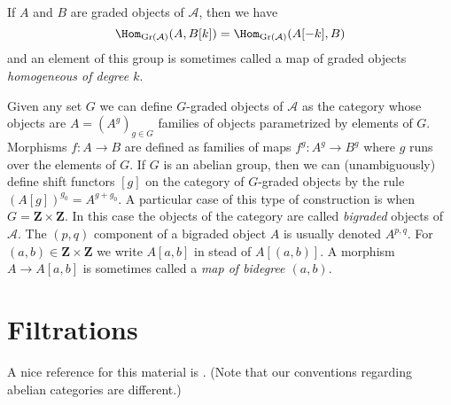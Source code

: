 \noindent
If $A$ and $B$ are graded objects of $\mathcal{A}$, then we have
\begin{equation}
\label{equation-hom-into-shift}
\Hom_{\text{Gr}(\mathcal{A})}(A, B[k]) =
\Hom_{\text{Gr}(\mathcal{A})}(A[-k], B)
\end{equation}
and an element of this group is sometimes called a map of graded
objects {\it homogeneous of degree $k$}.

\medskip\noindent
Given any set $G$ we can define $G$-graded objects of $\mathcal{A}$
as the category whose objects are $A = (A^g)_{g \in G}$
families of objects parametrized by elements of $G$. Morphisms
$f : A \to B$ are defined as families of maps $f^g : A^g \to B^g$
where $g$ runs over the elements of $G$. If $G$ is an abelian group,
then we can (unambiguously) define shift functors $[g]$ on the category
of $G$-graded objects by the rule $(A[g])^{g_0} = A^{g + g_0}$.
A particular case of this type of construction is when
$G = \mathbf{Z} \times \mathbf{Z}$. In this case the objects of
the category are called {\it bigraded} objects of $\mathcal{A}$.
The $(p, q)$ component of a bigraded object $A$ is usually denoted
$A^{p, q}$. For $(a, b) \in \mathbf{Z} \times \mathbf{Z}$ we write
$A[a, b]$ in stead of $A[(a, b)]$.
A morphism $A \to A[a, b]$ is sometimes called a
{\it map of bidegree $(a, b)$}.





\section{Filtrations}
\label{section-filtrations}

\noindent
A nice reference for this material is \cite[Section 1]{HodgeII}.
(Note that our conventions regarding abelian categories are different.)

